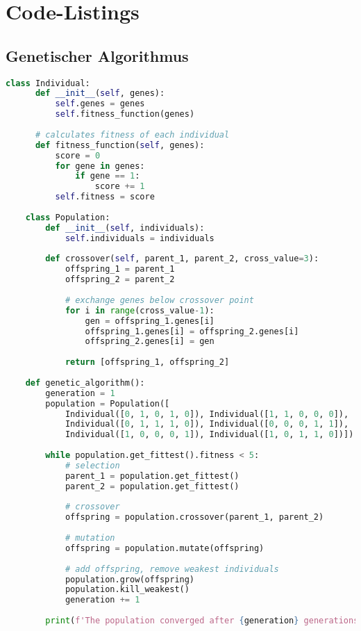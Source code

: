 \chapter{Code-Listings}

\section{Genetischer Algorithmus}

\begin{lstlisting}[language=Python, caption=Genetischer Algorithmus (Python)]
    class Individual:
      def __init__(self, genes):
          self.genes = genes
          self.fitness_function(genes)
      
      # calculates fitness of each individual
      def fitness_function(self, genes):
          score = 0
          for gene in genes:
              if gene == 1:
                  score += 1
          self.fitness = score
    
    class Population:
        def __init__(self, individuals):
            self.individuals = individuals
        
        def crossover(self, parent_1, parent_2, cross_value=3):
            offspring_1 = parent_1
            offspring_2 = parent_2
            
            # exchange genes below crossover point
            for i in range(cross_value-1):
                gen = offspring_1.genes[i]
                offspring_1.genes[i] = offspring_2.genes[i]
                offspring_2.genes[i] = gen
            
            return [offspring_1, offspring_2]
    
    def genetic_algorithm():
        generation = 1
        population = Population([
            Individual([0, 1, 0, 1, 0]), Individual([1, 1, 0, 0, 0]),
            Individual([0, 1, 1, 1, 0]), Individual([0, 0, 0, 1, 1]),
            Individual([1, 0, 0, 0, 1]), Individual([1, 0, 1, 1, 0])])
    
        while population.get_fittest().fitness < 5:
            # selection
            parent_1 = population.get_fittest()
            parent_2 = population.get_fittest()
    
            # crossover
            offspring = population.crossover(parent_1, parent_2)
    
            # mutation
            offspring = population.mutate(offspring)
    
            # add offspring, remove weakest individuals
            population.grow(offspring)
            population.kill_weakest()
            generation += 1
    
        print(f'The population converged after {generation} generations')
    \end{lstlisting}

\clearpage
\newpage
